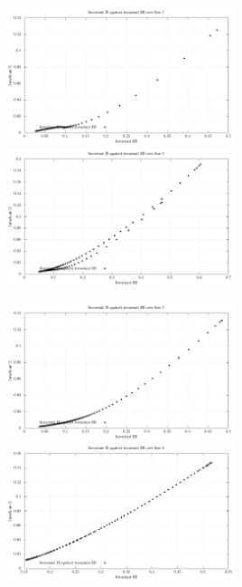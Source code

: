 \documentclass[11pt,letterpaper,english]{article}
\begin{document}
\begin{figure}
\begin{minipage}{0.5\linewidth}
  \begin{center}
    \includegraphics[height = 40mm]{./Figures/cs_lumley1.pdf}
  \end{center}
\end{minipage}\hfill
\begin{minipage}{0.5\linewidth}
   \begin{center}
    \includegraphics[height = 40mm]{./Figures/cs_lumley2.pdf}
   \end{center}
\end{minipage}
\end{figure}

\begin{figure}
\begin{minipage}{0.5\linewidth}
  \begin{center}
    \includegraphics[height = 40mm]{./Figures/cs_lumley3.pdf}
  \end{center}
\end{minipage}\hfill
\begin{minipage}{0.5\linewidth}
   \begin{center}
    \includegraphics[height = 40mm]{./Figures/cs_lumley4.pdf}
   \end{center}
\end{minipage}
\end{figure}
\end{document}
